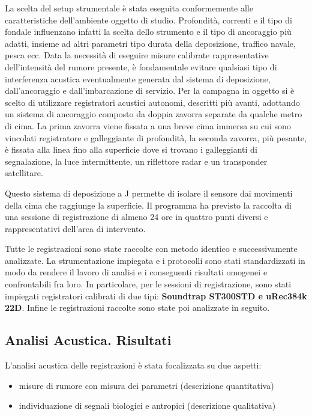 La scelta del setup strumentale è stata eseguita conformemente alle caratteristiche dell'ambiente oggetto di studio. 
Profondità, correnti e il tipo di fondale influenzano infatti la scelta dello strumento e il tipo di ancoraggio più adatti, insieme ad altri parametri tipo durata della deposizione, traffico navale, pesca ecc. 
Data la necessità di eseguire misure calibrate rappresentative dell'intensità del rumore presente, è fondamentale evitare qualsiasi tipo di interferenza acustica eventualmente generata dal sistema di deposizione, dall’ancoraggio e dall’imbarcazione di servizio. 
Per la campagna in oggetto si è scelto di utilizzare registratori acustici autonomi, descritti più avanti, adottando un sistema di ancoraggio composto da doppia zavorra separate da qualche metro di cima. 
La prima zavorra viene fissata a una breve cima immersa su cui sono vincolati registratore e galleggiante di profondità, la seconda zavorra, più pesante, è fissata alla linea fino alla superficie dove si trovano i galleggianti di segnalazione, la luce intermittente, un riflettore radar e un transponder satellitare. 

Questo sistema di deposizione a J permette di isolare il sensore dai movimenti della cima che raggiunge la superficie.
Il programma ha previsto la raccolta di una sessione di registrazione di almeno 24 ore in quattro punti diversi e rappresentativi dell’area di intervento. 

Tutte le registrazioni sono state raccolte con metodo identico e successivamente analizzate. 
La strumentazione impiegata e i protocolli sono stati standardizzati in modo da rendere il lavoro di analisi e i conseguenti risultati omogenei e confrontabili fra loro.
In particolare, per le sessioni di registrazione, sono stati impiegati registratori calibrati di due tipi: {\bfseries Soundtrap ST300STD e uRec384k 22D}.
Infine le registrazioni raccolte sono state poi analizzate in seguito. 

\subsection{Analisi Acustica. Risultati}
L’analisi acustica delle registrazioni è stata focalizzata su due aspetti:

\begin{itemize}
\item misure di rumore con misura dei parametri (descrizione quantitativa) 
\item individuazione di segnali biologici e antropici (descrizione qualitativa)
\end{itemize} 


